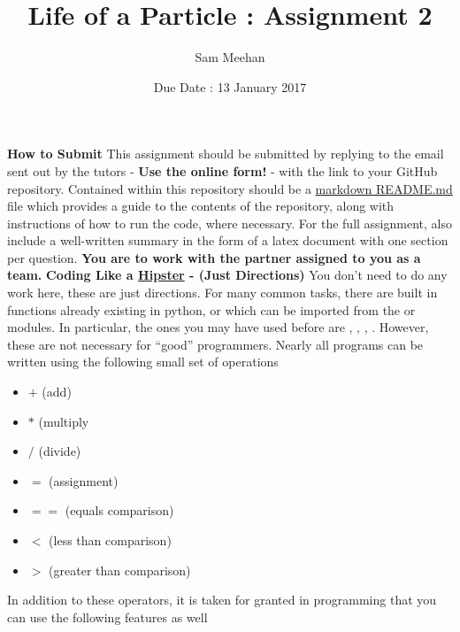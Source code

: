 \documentclass[12pt]{article}
\title{Life of a Particle : Assignment 2}
\author{Sam Meehan}
\date{Due Date : 13 January 2017}
\begin{document}
\maketitle

\textbf{How to Submit}
\newline
This assignment should be submitted by replying to the email sent out by the tutors - \textbf{Use the online form!} - with the link to your GitHub repository.  Contained within this repository should be a \href{https://github.com/adam-p/markdown-here/wiki/Markdown-Cheatsheet}{markdown README.md} file which provides a guide to the contents of the repository, along with instructions of how to run the code, where necessary.  For the full assignment, also include a well-written summary in the form of a latex document with one section per question.
\newline
\newline
\textbf{You are to work with the partner assigned to you as a team.}
\newline
\newline
\textbf{Coding Like a \href{https://www.urbandictionary.com/define.php?term=hipster}{Hipster} - (Just Directions)} 
\newline
You don't need to do any work here, these are just directions.  
\newline
\newline
For many common tasks, there are built in functions already existing in python, or which can be imported from the \small{} or \small{} modules.  In particular, the ones you may have used before are \small{}, \small{}, \small{}, \small{}.  However, these are not necessary for ``good'' programmers.  Nearly all programs can be written using the following small set of operations 
\begin{itemize}[noitemsep]
\item $+$ (add)
\item $*$ (multiply
\item $/$ (divide)
\item $=$ (assignment)
\item $==$ (equals comparison)
\item $<$ (less than comparison)
\item $>$ (greater than comparison)
\end{itemize}
In addition to these operators, it is taken for granted in programming that you can use the following features as well
\end{document}
